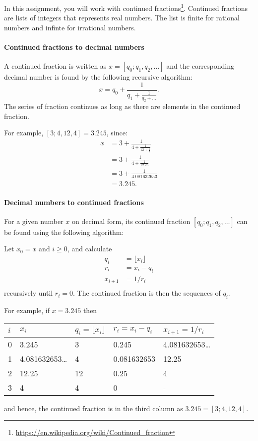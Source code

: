 In this assignment, you will work with continued fractions\footnote{\url{https://en.wikipedia.org/wiki/Continued_fraction}}. Continued fractions are lists of integers that represents real numbers. The list is finite for rational numbers and infinte for irrational numbers.

\paragraph{Continued fractions to decimal numbers}
A continued fraction is written as $x = [q_0; q_1, q_2, \ldots]$ and the corresponding decimal number is found by the following recursive algorithm:
\begin{equation}
  x = q_0 + \frac{1}{q_1 + \frac{1}{q_2 + \dots}}.
\end{equation}
The series of fraction continues as long as there are elements in the continued fraction.

For example, $[3;4, 12, 4] = 3.245$, since:
\begin{align}
  x &= 3 + \frac{1}{4 + \frac{1}{12 + \frac{1}{4}}}
  \\&=  3 + \frac{1}{4 + \frac{1}{12.25}}
  \\&=  3 + \frac{1}{4.081632653}
  \\&=  3.245.
\end{align}

\paragraph{Decimal numbers to continued fractions}
For a given number $x$ on decimal form, its continued fraction $[q_0; q_1, q_2, \ldots]$ can be found using the following algorithm:

Let $x_0 = x$ and $i \geq 0$, and calculate
\begin{align}
q_i &= \lfloor x_i \rfloor\\
r_i &= x_i - q_i\\
x_{i+1} &= 1/r_i\\
\end{align}
recursively until $r_i = 0$. The continued fraction is then the sequences of $q_i$.

For example, if $x=3.245$ then
\begin{center}
  \begin{tabular}{|l|l|l|l|l|}
    \hline
    $i$ & $x_i$ & $q_i = \lfloor x_i \rfloor$ & $r_i = x_i - q_i$ & $x_{i+1}=1/r_i$\\
    \hline
    0 & 3.245 & 3 & 0.245 & 4.081632653\ldots\\
    1 & 4.081632653\ldots & 4 & 0.081632653 & 12.25\\
    2 & 12.25 & 12 & 0.25 & 4\\
    3 & 4 & 4 & 0 & -\\
    \hline
  \end{tabular}
\end{center}
and hence, the continued fraction is in the third column as $3.245 = [3; 4, 12, 4]$.

